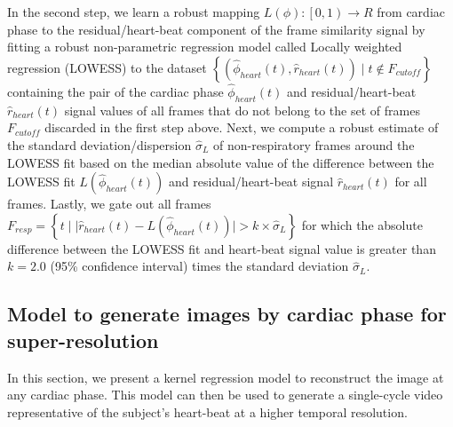 \documentclass[runningheads,a4paper]{llncs}
\begin{document}
	In the second step, we learn a robust mapping $L(\phi) : \left [  0, 1\right ) \to R$ from cardiac phase to the residual/heart-beat component of the frame similarity signal by fitting a robust non-parametric regression model called Locally weighted regression (LOWESS) to the dataset $\left \{ \left(\hat{\phi}_{heart}(t), \hat{r}_{heart}(t) \right) \mid t \notin F_{cutoff}  \right \}$ containing the pair of the cardiac phase $\hat{\phi}_{heart}(t)$ and residual/heart-beat $\hat{r}_{heart}(t)$ signal values of all frames that do not belong to the set of frames $F_{cutoff}$ discarded in the first step above. Next, we compute a robust estimate of the standard deviation/dispersion $\hat{\sigma}_{L}$ of non-respiratory frames around the LOWESS fit based on the median absolute value of the difference between the LOWESS fit $L( \hat{\phi}_{heart}(t) )$ and residual/heart-beat signal $\hat{r}_{heart}(t)$ for all frames. Lastly, we gate out all frames $F_{resp} = \left \{ t \; \big\lvert \; \lvert \hat{r}_{heart}(t) - L( \hat{\phi}_{heart}(t) ) \rvert   > k \times \hat{\sigma}_{L}  \right \}$ for which the absolute  difference between the LOWESS fit and heart-beat signal value is greater than $k = 2.0$ (95\% confidence interval) times the standard deviation $\hat{\sigma}_{L}$.	
%
\vspace{-0.5cm}
\subsection{Model to generate images by cardiac phase for super-resolution}
\label{sec:method:super_resolution}
%
In this section, we present a kernel regression model to reconstruct the image at any cardiac phase. This model can then be used to generate a single-cycle video representative of the subject's heart-beat at a higher temporal resolution.
\end{document}
